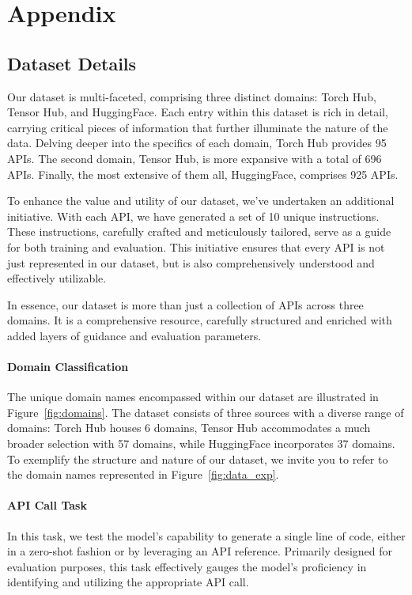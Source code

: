 \newpage
\section{Appendix}

\subsection{Dataset Details}
Our dataset is multi-faceted, comprising three distinct domains: Torch Hub, Tensor Hub, and HuggingFace. Each entry within this dataset is rich in detail, carrying critical pieces of information that further illuminate the nature of the data. Delving deeper into the specifics of each domain, Torch Hub provides 95 APIs. The second domain, Tensor Hub, is more expansive with a total of 696 APIs. Finally, the most extensive of them all, HuggingFace, comprises 925 APIs.

To enhance the value and utility of our dataset, we've undertaken an additional initiative. With each API, we have generated a set of 10 unique instructions. These instructions, carefully crafted and meticulously tailored, serve as a guide for both training and evaluation. This initiative ensures that every API is not just represented in our dataset, but is also comprehensively understood and effectively utilizable.

In essence, our dataset is more than just a collection of APIs across three domains. It is a comprehensive resource, carefully structured and enriched with added layers of guidance and evaluation parameters.

\paragraph{Domain Classification} The unique domain names encompassed within our dataset are illustrated in Figure~\ref{fig:domains}. The dataset consists of three sources with a diverse range of domains: Torch Hub houses 6 domains, Tensor Hub accommodates a much broader selection with 57 domains, while HuggingFace incorporates 37 domains. To exemplify the structure and nature of our dataset, we invite you to refer to the domain names represented in Figure~\ref{fig:data_exp}.

\paragraph{API Call Task} In this task, we test the model's capability to generate a single line of code, either in a zero-shot fashion or by leveraging an API reference. Primarily designed for evaluation purposes, this task effectively gauges the model's proficiency in identifying and utilizing the appropriate API call. 

